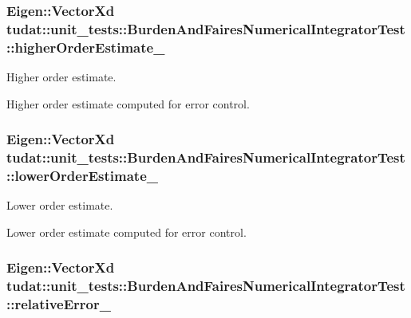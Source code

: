 \subsubsection[{\texorpdfstring{higher\+Order\+Estimate\+\_\+}{higherOrderEstimate_}}]{\setlength{\rightskip}{0pt plus 5cm}Eigen\+::\+Vector\+Xd tudat\+::unit\+\_\+tests\+::\+Burden\+And\+Faires\+Numerical\+Integrator\+Test\+::higher\+Order\+Estimate\+\_\+}\hypertarget{classtudat_1_1unit__tests_1_1BurdenAndFairesNumericalIntegratorTest_a1971ea7cf0958eb3200b35644516e2bf}{}\label{classtudat_1_1unit__tests_1_1BurdenAndFairesNumericalIntegratorTest_a1971ea7cf0958eb3200b35644516e2bf}


Higher order estimate. 

Higher order estimate computed for error control. 
\subsubsection[{\texorpdfstring{lower\+Order\+Estimate\+\_\+}{lowerOrderEstimate_}}]{\setlength{\rightskip}{0pt plus 5cm}Eigen\+::\+Vector\+Xd tudat\+::unit\+\_\+tests\+::\+Burden\+And\+Faires\+Numerical\+Integrator\+Test\+::lower\+Order\+Estimate\+\_\+}\hypertarget{classtudat_1_1unit__tests_1_1BurdenAndFairesNumericalIntegratorTest_abef947500fcc216338b8232322e1870f}{}\label{classtudat_1_1unit__tests_1_1BurdenAndFairesNumericalIntegratorTest_abef947500fcc216338b8232322e1870f}


Lower order estimate. 

Lower order estimate computed for error control. 
\subsubsection[{\texorpdfstring{relative\+Error\+\_\+}{relativeError_}}]{\setlength{\rightskip}{0pt plus 5cm}Eigen\+::\+Vector\+Xd tudat\+::unit\+\_\+tests\+::\+Burden\+And\+Faires\+Numerical\+Integrator\+Test\+::relative\+Error\+\_\+}\hypertarget{classtudat_1_1unit__tests_1_1BurdenAndFairesNumericalIntegratorTest_ad4421029c5b1ac5077f1365af4552135}{}\label{classtudat_1_1unit__tests_1_1BurdenAndFairesNumericalIntegratorTest_ad4421029c5b1ac5077f1365af4552135}


